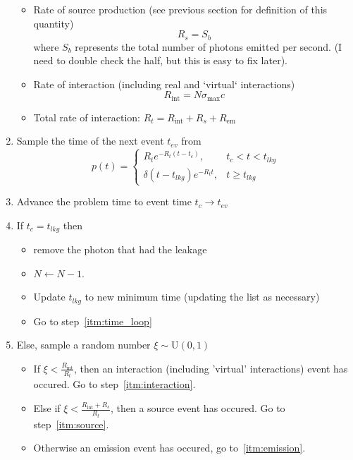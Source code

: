 \documentclass{article}
\newcommand{\Rin}{\ensuremath{R_{\text{int}}}}
\newcommand{\Rem}{\ensuremath{R_{\text{em}}}}
\begin{document}
\begin{enumerate}
\begin{itemize}
  \item Rate of source production (see previous section for definition of this
quantity)
\begin{equation}
  R_s = S_b
\end{equation}
where $S_b$ represents the total number of photons emitted per second. (I need
to double check the half, but this is easy to fix later).
  \item Rate of interaction (including real and `virtual` interactions)
\begin{equation}
  \Rin = N \sigma_{\max} c
\end{equation}
  \item Total rate of interaction: $R_t = \Rin + R_s + \Rem$
\end{itemize}
\item \label{itm:time_loop} Sample the time of the next event $t_{ev}$ from
\begin{equation}
p(t) = \left\{\begin{matrix}
          R_t e^{-R_t (t-t_c)}, & t_c < t < t_{lkg}   \\ 
          \delta(t-t_{lkg})e^{-R_t t}, & t \geq t_{lkg} 
\end{matrix}\right.
\end{equation}
\item Advance the problem time to event time $t_c \rightarrow t_{ev}$
\item If $t_c = t_{lkg}$ then
\begin{itemize}
  \item remove the photon that had the leakage
  \item $N\leftarrow N-1$.
  \item Update $t_{lkg}$ to new minimum time (updating the list as necessary)
  \item Go to step~\ref{itm:time_loop}
\end{itemize}
\item Else, sample a random number $\xi\sim\text{U}(0,1)$
\begin{itemize}
\item If $\xi < \frac{\Rin}{R_{t}}$, then an interaction (including 'virtual'
interactions) event has occured. Go to step~\ref{itm:interaction}.
\item Else if $\xi < \frac{\Rin+R_s}{R_t}$, then a source event has occured.
Go to step~\ref{itm:source}.
\item Otherwise an emission event has occured, go to~\ref{itm:emission}.
\end{itemize}

\end{enumerate}
\end{document}
